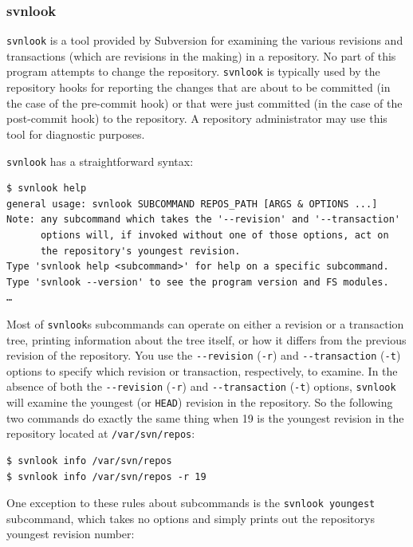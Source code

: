 \subsubsection{svnlook}\label{svn.reposadmin.maint.tk.svnlook}

\texttt{svnlook} is a tool provided by Subversion for examining the
various revisions and transactions (which are revisions in the making)
in a repository. No part of this program attempts to change the
repository. \texttt{svnlook} is typically used by the repository hooks
for reporting the changes that are about to be committed (in the case of
the pre-commit hook) or that were just committed (in the case of the
post-commit hook) to the repository. A repository administrator may use
this tool for diagnostic purposes.

\texttt{svnlook} has a straightforward syntax:

\begin{verbatim}
$ svnlook help
general usage: svnlook SUBCOMMAND REPOS_PATH [ARGS & OPTIONS ...]
Note: any subcommand which takes the '--revision' and '--transaction'
      options will, if invoked without one of those options, act on
      the repository's youngest revision.
Type 'svnlook help <subcommand>' for help on a specific subcommand.
Type 'svnlook --version' to see the program version and FS modules.
…
\end{verbatim}

Most of \texttt{svnlook}\textquotesingle s subcommands can operate on
either a revision or a transaction tree, printing information about the
tree itself, or how it differs from the previous revision of the
repository. You use the \texttt{-\/-revision} (\texttt{-r}) and
\texttt{-\/-transaction} (\texttt{-t}) options to specify which revision
or transaction, respectively, to examine. In the absence of both the
\texttt{-\/-revision} (\texttt{-r}) and \texttt{-\/-transaction}
(\texttt{-t}) options, \texttt{svnlook} will examine the youngest (or
\texttt{HEAD}) revision in the repository. So the following two commands
do exactly the same thing when 19 is the youngest revision in the
repository located at \texttt{/var/svn/repos}:

\begin{verbatim}
$ svnlook info /var/svn/repos
$ svnlook info /var/svn/repos -r 19
\end{verbatim}

One exception to these rules about subcommands is the
\texttt{svnlook\ youngest} subcommand, which takes no options and simply
prints out the repository\textquotesingle s youngest revision number:

